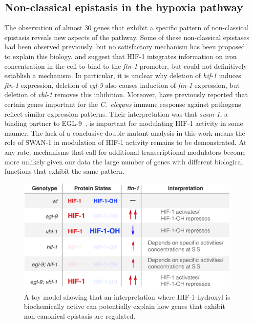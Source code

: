 \documentclass[9pt,twocolumn,twoside]{pnas-new}
\newcommand{\cel}{\emph{C.~elegans}}
\newcommand{\gene}[1]{\emph{#1}}
\newcommand{\ftna}{\emph{ftn-1}}
\newcommand{\eglp}{EGL-9}
\newcommand{\hifp}{HIF-1}
\begin{document}
\subsection*{Non-classical epistasis in the hypoxia pathway}
The observation of almost 30 genes that exhibit a specific pattern of non-classical
epistasis reveals new aspects of the pathway. Some of these non-classical
epistases had been observed previously, but no satisfactory mechanism has been
proposed to explain this biology. \citep{Romney2011} and \citep{Ackerman2012}
suggest that \hifp{} integrates information on iron concentration in the
cell to bind to the \ftna{} promoter, but could not definitively establish
a mechanism.
In particular, it is unclear why deletion of \gene{hif-1} induces \ftna{}
expression, deletion of \gene{egl-9} also causes induction of \ftna{} expression,
but deletion of \gene{vhl-1} removes this inhibition. Moreover, \citep{Luhachack2012}
have previously reported that certain genes important for the \cel{} immune response
against pathogens reflect similar expression patterns. Their interpretation
was that \gene{swan-1}, a binding partner to \eglp{}~\cite{Shao2010}, is important
for modulating \hifp{} activity in some manner. The lack of a conclusive double
mutant analysis in this work means the role of SWAN-1 in modulation of
\hifp{} activity remains to be demonstrated.
At any rate, mechanisms that call for additional
transcriptional modulators become more unlikely given our data the large number of
genes with different biological functions that exhibit the same pattern.

\begin{figure}[tbhp]
\centering
\includegraphics[width=\linewidth]{figs/hif1oh_model.pdf}
\caption{
A toy model showing that an interpretation where \hifp{}-hydroxyl
is biochemically active can potentially explain how genes that exhibit
non-canonical epistasis are regulated.
}
\label{fig:hif1oh_table}
\end{figure}
\end{document}
